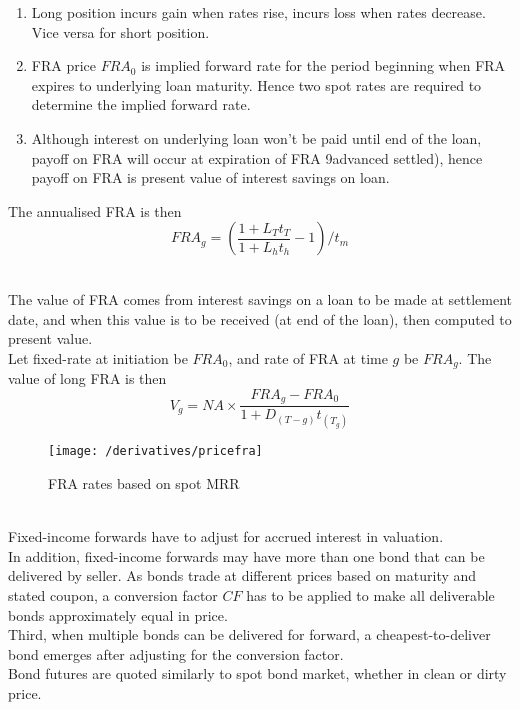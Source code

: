 \begin{method} 
\begin{enumerate}[label=\roman*.]
\setlength{\itemsep}{0pt}
\item Long position incurs gain when rates rise, incurs loss when rates decrease. Vice versa for short position.
\item FRA price $FRA_0$ is implied forward rate for the period beginning when FRA expires to underlying loan maturity. Hence two spot rates are required to determine the implied forward rate.
\item Although interest on underlying loan won't be paid until end of the loan, payoff on FRA will occur at expiration of FRA 9advanced settled), hence payoff on FRA is present value of interest savings on loan.
\end{enumerate}
The annualised FRA is then
\begin{equation}
FRA_g = \left(\frac{1 + L_T t_T}{1 + L_h t_h} - 1 \right)/t_m \nonumber
\end{equation}
\end{method}

\begin{method} \\
The value of FRA comes from interest savings on a loan to be made at settlement date, and when this value is to be received (at end of the loan), then computed to present value.\\
Let fixed-rate at initiation be $FRA_0$, and rate of FRA at time $g$ be $FRA_g$. The value of long FRA is then
\begin{equation}
V_g = NA \times \frac{FRA_g - FRA_0}{1 + D_{(T-g)} t_{(T_g)}} \nonumber
\end{equation}
\end{method}

\begin{figure}[H]
\centering
\texttt{[image: /derivatives/pricefra]}
\caption{FRA rates based on spot MRR}
\end{figure}

\begin{remark} \\
Fixed-income forwards have to adjust for accrued interest in valuation.\\
In addition, fixed-income forwards may have more than one bond that can be delivered by seller. As bonds trade at different prices based on maturity and stated coupon, a conversion factor $CF$ has to be applied to make all deliverable bonds approximately equal in price.\\
Third, when multiple bonds can be delivered for forward, a cheapest-to-deliver bond emerges after adjusting for the conversion factor.\\
Bond futures are quoted similarly to spot bond market, whether in clean or dirty price.
\end{remark}

